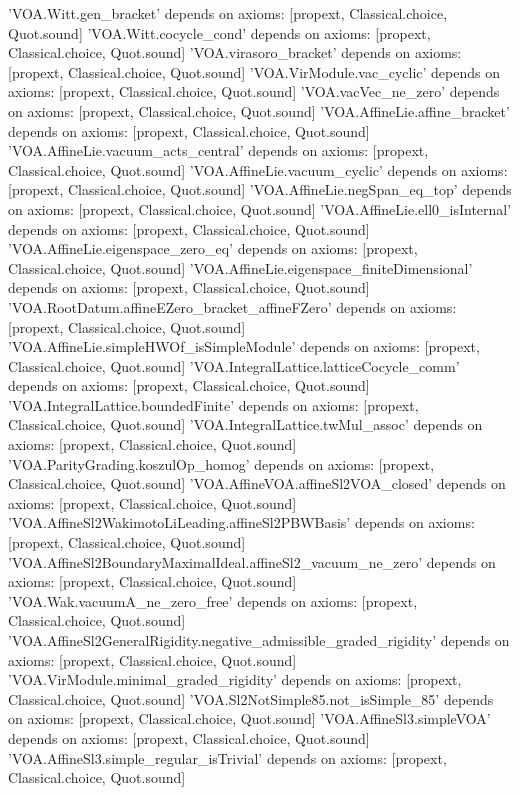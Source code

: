 \begin{plaincode}
'VOA.Witt.gen_bracket' depends on axioms: [propext, Classical.choice, Quot.sound]
'VOA.Witt.cocycle_cond' depends on axioms: [propext, Classical.choice, Quot.sound]
'VOA.virasoro_bracket' depends on axioms: [propext, Classical.choice, Quot.sound]
'VOA.VirModule.vac_cyclic' depends on axioms: [propext, Classical.choice, Quot.sound]
'VOA.vacVec_ne_zero' depends on axioms: [propext, Classical.choice, Quot.sound]
'VOA.AffineLie.affine_bracket' depends on axioms: [propext, Classical.choice, Quot.sound]
'VOA.AffineLie.vacuum_acts_central' depends on axioms: [propext, Classical.choice, Quot.sound]
'VOA.AffineLie.vacuum_cyclic' depends on axioms: [propext, Classical.choice, Quot.sound]
'VOA.AffineLie.negSpan_eq_top' depends on axioms: [propext, Classical.choice, Quot.sound]
'VOA.AffineLie.ell0_isInternal' depends on axioms: [propext, Classical.choice, Quot.sound]
'VOA.AffineLie.eigenspace_zero_eq' depends on axioms: [propext, Classical.choice, Quot.sound]
'VOA.AffineLie.eigenspace_finiteDimensional' depends on axioms: [propext, Classical.choice, Quot.sound]
'VOA.RootDatum.affineEZero_bracket_affineFZero' depends on axioms: [propext, Classical.choice, Quot.sound]
'VOA.AffineLie.simpleHWOf_isSimpleModule' depends on axioms: [propext, Classical.choice, Quot.sound]
'VOA.IntegralLattice.latticeCocycle_comm' depends on axioms: [propext, Classical.choice, Quot.sound]
'VOA.IntegralLattice.boundedFinite' depends on axioms: [propext, Classical.choice, Quot.sound]
'VOA.IntegralLattice.twMul_assoc' depends on axioms: [propext, Classical.choice, Quot.sound]
'VOA.ParityGrading.koszulOp_homog' depends on axioms: [propext, Classical.choice, Quot.sound]
'VOA.AffineVOA.affineSl2VOA_closed' depends on axioms: [propext, Classical.choice, Quot.sound]
'VOA.AffineSl2WakimotoLiLeading.affineSl2PBWBasis' depends on axioms: [propext, Classical.choice, Quot.sound]
'VOA.AffineSl2BoundaryMaximalIdeal.affineSl2_vacuum_ne_zero' depends on axioms: [propext, Classical.choice, Quot.sound]
'VOA.Wak.vacuumA_ne_zero_free' depends on axioms: [propext, Classical.choice, Quot.sound]
'VOA.AffineSl2GeneralRigidity.negative_admissible_graded_rigidity' depends on axioms: [propext, Classical.choice, Quot.sound]
'VOA.VirModule.minimal_graded_rigidity' depends on axioms: [propext, Classical.choice, Quot.sound]
'VOA.Sl2NotSimple85.not_isSimple_85' depends on axioms: [propext, Classical.choice, Quot.sound]
'VOA.AffineSl3.simpleVOA' depends on axioms: [propext, Classical.choice, Quot.sound]
'VOA.AffineSl3.simple_regular_isTrivial' depends on axioms: [propext, Classical.choice, Quot.sound]

\end{plaincode}
